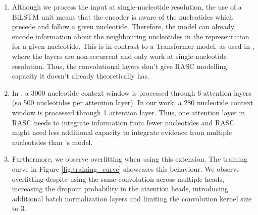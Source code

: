 \begin{enumerate}
	\item Although we process the input at single-nucleotide resolution, the use of a BiLSTM unit means that the encoder is aware of the nucleotides which precede and follow a given nucleotide. Therefore, the model can already encode information about the neighbouring nucleotides in the representation for a given nucleotide. This is in contrast to a Transformer model, as used in \cite{ghentransformers}, where the layers are non-recurrent and only work at single-nucleotide resolution. Thus, the convolutional layers don't give RASC modelling capacity it doesn't already theoretically has.
	\item In \cite{ghentransformers}, a 3000 nucleotide context window is processed through 6 attention layers (so 500 nucleotides per attention layer). In our work, a 280 nucleotide context window is processed through 1 attention layer. Thus, one attention layer in RASC needs to integrate information from fewer nucleotides and RASC might need less additional capacity to integrate evidence from multiple nucleotides than \cite{ghentransformers}'s model. 
	

	\item Furthermore, we observe overfitting when using this extension. The training curve in Figure \ref{fig:training_curve}
	showcases this behaviour. We observe overfitting despite using the same convolution across multiple heads, increasing the dropout probability in the attention heads, introducing additional batch normalization layers and limiting the convolution kernel size to 3.
\end{enumerate}


